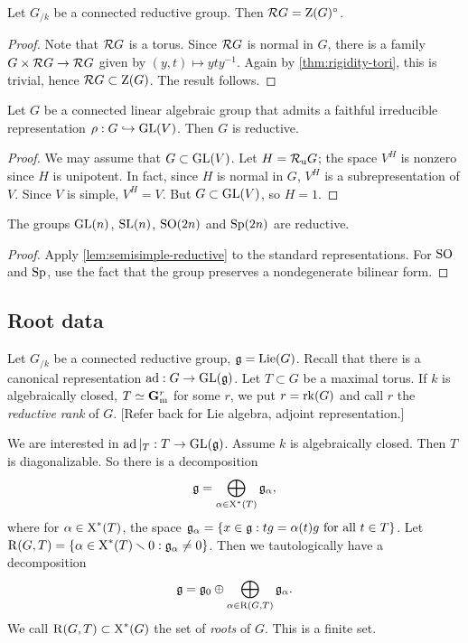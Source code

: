 \begin{lemma}
Let $G_{/k}$ be a connected reductive group. Then $\mathcal{R} G=\operatorname{Z}(G)^\circ$. 
\end{lemma}
\begin{proof}
Note that $\mathcal{R} G$ is a torus. Since $\mathcal{R} G$ is normal in $G$, there is a 
family $G\times \mathcal{R} G\to \mathcal{R} G$ given by $(y,t)\mapsto y t y^{-1}$. Again 
by \autoref{thm:rigidity-tori}, this is trivial, hence 
$\mathcal{R} G\subset \operatorname{Z}(G)$. The result follows. 
\end{proof}

\begin{lemma}\label{lem:semisimple-reductive}
Let $G$ be a connected linear algebraic group that admits a faithful 
irreducible representation $\rho:G\hookrightarrow \operatorname{GL}(V)$. Then $G$ is reductive. 
\end{lemma}
\begin{proof}
We may assume that $G\subset \operatorname{GL}(V)$. Let $H=\mathcal{R}_\mathrm{u} G$; the space $V^H$ is 
nonzero since $H$ is unipotent. In fact, since $H$ is normal in $G$, 
$V^H$ is a subrepresentation of $V$. Since $V$ is simple, $V^H=V$. But 
$G\subset \operatorname{GL}(V)$, so $H=1$. 
\end{proof}

\begin{corollary}
The groups $\operatorname{GL}(n)$, $\operatorname{SL}(n)$, $\operatorname{SO}(2n)$ and $\operatorname{Sp}(2n)$ are reductive. 
\end{corollary}
\begin{proof}
Apply \autoref{lem:semisimple-reductive} to the standard representations. For 
$\operatorname{SO}$ and $\operatorname{Sp}$, use the fact that the group preserves a nondegenerate bilinear 
form. 
\end{proof}





\subsection{Root data}

Let $G_{/k}$ be a connected reductive group, $\mathfrak{g}=\operatorname{Lie}(G)$. Recall that there 
is a canonical representation $\operatorname{ad}:G\to \operatorname{GL}(\mathfrak{g})$. Let $T\subset G$ be a 
maximal torus. If $k$ is algebraically closed, $T\simeq \mathbf{G}_\mathrm{m}^r$ for some $r$, 
we put $r=\operatorname{rk}(G)$ and call $r$ the \emph{reductive rank} of $G$. [Refer back 
for Lie algebra, adjoint representation.]

We are interested in $\operatorname{ad}|_T:T\to \operatorname{GL}(\mathfrak{g})$. Assume $k$ is algebraically 
closed. Then $T$ is diagonalizable. So there is a decomposition 
\[
  \mathfrak{g} = \bigoplus_{\alpha\in\operatorname{X}^\ast(T)} \mathfrak{g}_\alpha ,
\]
where for $\alpha\in \operatorname{X}^\ast(T)$, the space 
$\mathfrak{g}_\alpha=\{x\in \mathfrak{g}:t g=\alpha(t) g\text{ for all }t\in T\}$. Let 
$\operatorname{R}(G,T) = \{\alpha\in \operatorname{X}^\ast(T)\smallsetminus 0:\mathfrak{g}_\alpha\ne 0\}$. 
Then we tautologically have a decomposition 
\[
  \mathfrak{g}=\mathfrak{g}_0\oplus \bigoplus_{\alpha\in \operatorname{R}(G,T)} \mathfrak{g}_\alpha .
\]
We call $\operatorname{R}(G,T)\subset \operatorname{X}^\ast(G)$ the set of \emph{roots} of 
$G$. This is a finite set. 

